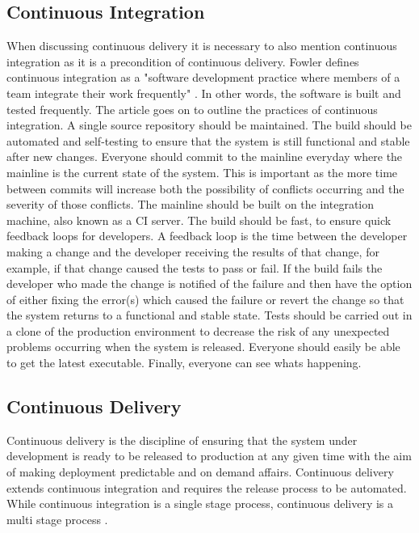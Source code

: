 \documentclass[10pt,journal,compsoc]{IEEEtran}
\begin{document}
\subsection{Continuous Integration}
When discussing continuous delivery it is necessary to also mention continuous integration as it is a precondition of continuous delivery. Fowler defines continuous integration as a "software development practice where members of a team integrate their work frequently" \cite{fowler2006continuous}. In other words, the software is built and tested frequently. The article goes on to outline the practices of continuous integration. A single source repository should be maintained. The build should be automated and self-testing to ensure that the system is still functional and stable after new changes. Everyone should commit to the mainline everyday where the mainline is the current state of the system. This is important as the more time between commits will increase both the possibility of conflicts occurring and the severity of those conflicts. The mainline should be built on the integration machine, also known as a CI server. The build should be fast, to ensure quick feedback loops for developers. A feedback loop is the time between the developer making a change and the developer receiving the results of that change, for example, if that change caused the tests to pass or fail. If the build fails the developer who made the change is notified of the failure and then have the option of either fixing the error(s) which caused the failure or revert the change so that the system returns to a functional and stable state. Tests should be carried out in a clone of the production environment to decrease the risk of any unexpected problems occurring when the system is released. Everyone should easily be able to get the latest executable. Finally, everyone can see whats happening.


\subsection{Continuous Delivery}
Continuous delivery is the discipline of ensuring that the system under development is ready to be released to production at any given time with the aim of making deployment predictable and on demand affairs. Continuous delivery extends continuous integration and requires the release process to be automated. While continuous integration is a single stage process, continuous delivery is a multi stage process \cite{LAUKKANEN201755}.
\end{document}
